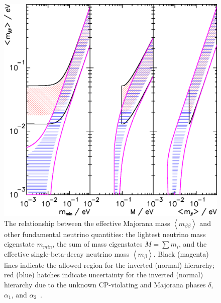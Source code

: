 \begin{figure}
\begin{center}
\includegraphics[keepaspectratio=true,width=\textwidth]{PDGNeutrinoMassBounds.eps}
\end{center}
\caption{The relationship between the effective Majorana mass $\left<m_{\beta\beta}\right>$ and other fundamental neutrino quantities: the lightest neutrino mass eigenstate $m_{min}$, the sum of mass eigenstates $M = \sum m_i$, and the effective single-beta-decay neutrino mass $\left<m_{\beta}\right>$.  Black (magenta) lines indicate the allowed region for the inverted (normal) hierarchy; red (blue) hatches indicate uncertainty for the inverted (normal) hierarchy due to the unknown CP-violating and Majorana phases $\delta$, $\alpha_1$, and $\alpha_2$~\cite{PDG}.}
\label{fig:NeutrinoMassBounds}
\end{figure}

